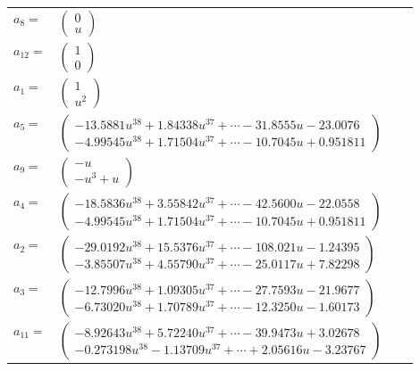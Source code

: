 \documentclass[1p]{elsarticle_modified}
\theoremstyle{definition}
\begin{document}
\begin{tabular}{m{7pt} m{180pt} m{7pt} m{180pt} }
\flushright $a_{8}=$&$\begin{pmatrix}0\\u\end{pmatrix}$ \\
\flushright $a_{12}=$&$\begin{pmatrix}1\\0\end{pmatrix}$ \\
\flushright $a_{1}=$&$\begin{pmatrix}1\\u^2\end{pmatrix}$ \\
\flushright $a_{5}=$&$\begin{pmatrix}-13.5881 u^{38}+1.84338 u^{37}+\cdots-31.8555 u-23.0076\\-4.99545 u^{38}+1.71504 u^{37}+\cdots-10.7045 u+0.951811\end{pmatrix}$ \\
\flushright $a_{9}=$&$\begin{pmatrix}- u\\- u^3+u\end{pmatrix}$ \\
\flushright $a_{4}=$&$\begin{pmatrix}-18.5836 u^{38}+3.55842 u^{37}+\cdots-42.5600 u-22.0558\\-4.99545 u^{38}+1.71504 u^{37}+\cdots-10.7045 u+0.951811\end{pmatrix}$ \\
\flushright $a_{2}=$&$\begin{pmatrix}-29.0192 u^{38}+15.5376 u^{37}+\cdots-108.021 u-1.24395\\-3.85507 u^{38}+4.55790 u^{37}+\cdots-25.0117 u+7.82298\end{pmatrix}$ \\
\flushright $a_{3}=$&$\begin{pmatrix}-12.7996 u^{38}+1.09305 u^{37}+\cdots-27.7593 u-21.9677\\-6.73020 u^{38}+1.70789 u^{37}+\cdots-12.3250 u-1.60173\end{pmatrix}$ \\
\flushright $a_{11}=$&$\begin{pmatrix}-8.92643 u^{38}+5.72240 u^{37}+\cdots-39.9473 u+3.02678\\-0.273198 u^{38}-1.13709 u^{37}+\cdots+2.05616 u-3.23767\end{pmatrix}$ \\

\end{tabular}
\end{document}
